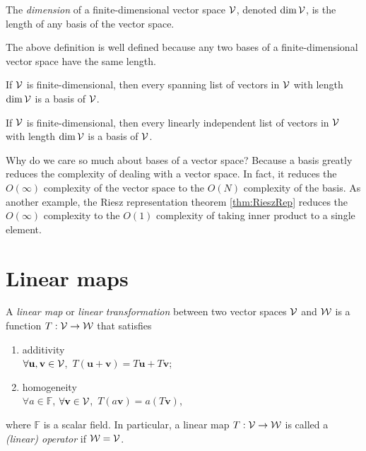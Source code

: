 \begin{defn}
  The \emph{dimension} of a finite-dimensional vector space
  ${\cal V}$,
  denoted $\dim {\cal V}$,
  is the length of any basis of the vector space.
\end{defn}

\begin{rem}
  The above definition is well defined because
  any two bases of a finite-dimensional vector space
  have the same length.
\end{rem}

\begin{lem}
  \label{lem:spanningListAndDimImpliesBasis}
  If ${\cal V}$ is finite-dimensional,
  then every spanning list of vectors in ${\cal V}$
  with length $\dim {\cal V}$
  is a basis of ${\cal V}$.
\end{lem}

\begin{lem}
  \label{lem:linearIndependenceAndDimImpliesBasis}
  If ${\cal V}$ is finite-dimensional,
  then every linearly independent list of vectors in ${\cal V}$
  with length $\dim {\cal V}$
  is a basis of ${\cal V}$.
\end{lem}

\begin{rem}
  Why do we care so much about bases of a vector space?
  Because a basis greatly reduces the complexity
  of dealing with a vector space.
  In fact, it reduces the $O(\infty)$ complexity
  of the vector space
  to the $O(N)$ complexity
  of the basis.
  As another example,
  the Riesz representation theorem \ref{thm:RieszRep}
  reduces the $O(\infty)$ complexity
  to the $O(1)$ complexity of taking
  inner product to a single element.
\end{rem}


\section{Linear maps}
\label{sec:linear-maps}

\begin{defn}
  \label{def:linearMap}
  A \emph{linear map} or \emph{linear transformation}
  between two vector spaces ${\cal V}$ and ${\cal W}$
  is a function $T: {\cal V}\rightarrow{\cal W}$
  that satisfies
  \begin{enumerate}[(LNM-1)]\itemsep0em
    \itemsep0em
  \item additivity\\
    $\forall \mathbf{u}, \mathbf{v}\in {\cal V}$,\ 
    $T(\mathbf{u}+\mathbf{v}) = T\mathbf{u} + T\mathbf{v}$;
  \item homogeneity\\
    $\forall a\in \mathbb{F}$, $\forall\mathbf{v}\in{\cal V}$,\ 
    $T(a\mathbf{v})=a(T\mathbf{v})$,
  \end{enumerate}
  where $\mathbb{F}$ is a scalar field.
  In particular, a linear map $T: {\cal V}\rightarrow{\cal W}$
  is called a \emph{(linear) operator} if ${\cal W}={\cal V}$.
\end{defn}

